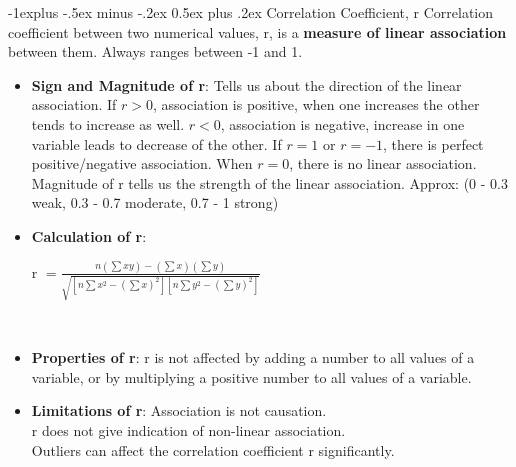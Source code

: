 \documentclass[10pt, landscape]{article}
\makeatletter
\renewcommand{\subsection}{\@startsection{subsection}{2}{0mm}%
                                {-1explus -.5ex minus -.2ex}%
                                {0.5ex plus .2ex}%
                                {\normalfont\normalsize\bfseries}}
\makeatother
\begin{document}
\begin{multicols*}{4}
\subsection{Correlation Coefficient, r}
	Correlation coefficient between two numerical values, r, is a \textbf{measure of linear association} between them. Always ranges between -1 and 1.
\begin{itemize}
	\item \textbf{Sign and Magnitude of r}: Tells us about the direction of the linear association. If $r>0$, association is positive, when one increases the other tends to increase as well. $r<0$, association is negative, increase in one variable leads to decrease of the other. If $r=1$ or $r=-1$, there is perfect positive/negative association. When $r=0$, there is no linear association. Magnitude of r tells us the strength of the linear association. Approx: (0 - 0.3 weak, 0.3 - 0.7 moderate, 0.7 - 1 strong)
	\item \textbf{Calculation of r}: \\
	\centerline{\large r $= \frac{n(\sum xy) - (\sum x)(\sum y)}{\sqrt{[n \sum x^2  - (\sum x)^2][n \sum y^2 - (\sum y)^2] }} $ } ~\\
	\item \textbf{Properties of r}: r is not affected by adding a number to all values of a variable, or by multiplying a positive number to all values of a variable.
	\item \textbf{Limitations of r}: Association is not causation. \\
	r does not give indication of non-linear association. \\
	Outliers can affect the correlation coefficient r significantly.
\end{itemize}


\end{multicols*}
\end{document}
